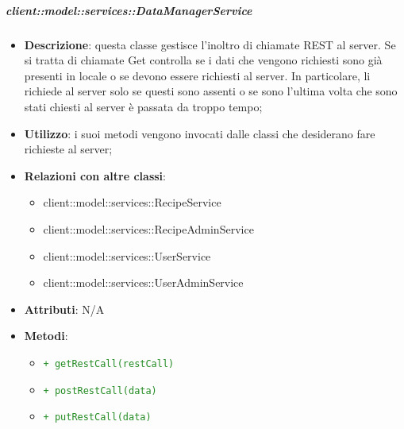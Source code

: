 		\subparagraph{client::model::services::DataManagerService} %
		\label{subp:radarchartcreator}
			\begin{itemize}
				\item \textbf{Descrizione}: questa classe gestisce l'inoltro di chiamate REST al server. Se si tratta di chiamate Get controlla se i dati che vengono richiesti sono già presenti in locale o se devono essere richiesti al server. In particolare, li richiede al server solo se questi sono assenti o se sono l'ultima volta che sono stati chiesti al server è passata da troppo tempo;
				\item \textbf{Utilizzo}: i suoi metodi vengono invocati dalle classi che desiderano fare richieste al server;
				\item \textbf{Relazioni con altre classi}:
					\begin{itemize}
						\item client::model::services::RecipeService
						\item client::model::services::RecipeAdminService
						\item client::model::services::UserService
						\item client::model::services::UserAdminService
					\end{itemize}
				\item \textbf{Attributi}: N/A
				\item \textbf{Metodi}: 
				\begin{itemize}
					\item \textcolor{forestgreen}{\texttt{+ getRestCall(restCall)}}
					\item \textcolor{forestgreen}{\texttt{+ postRestCall(data)}}
					\item \textcolor{forestgreen}{\texttt{+ putRestCall(data)}}
						\begin{description}

\end{description}
\end{itemize}
\end{itemize}
